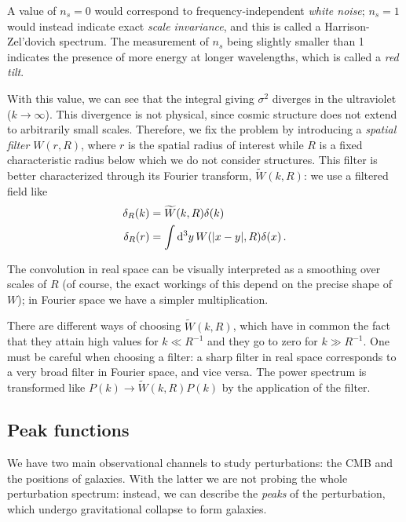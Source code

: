 \documentclass[main.tex]{subfiles}
\begin{document}
A value of \(n_s = 0\) would correspond to frequency-independent \emph{white noise}; \(n_s = 1\) would instead indicate exact \emph{scale invariance}, and this is called a Harrison-Zel'dovich spectrum.
The measurement of \(n_s\) being slightly smaller than 1 indicates the presence of more energy at longer wavelengths, which is called a \emph{red tilt}. 

With this value, we can see that the integral giving \(\sigma^2\) diverges in the ultraviolet (\(k \to \infty\)). 
This divergence is not physical, since cosmic structure does not extend to arbitrarily small scales. Therefore, we fix the problem by introducing a \emph{spatial filter} \(W(r, R)\), where \(r\) is the spatial radius of interest while \(R\) is a fixed characteristic radius below which we do not consider structures. This filter is better characterized through its Fourier transform, \(\widetilde{W}(k, R)\): we use a filtered field like 
%
\begin{align}
\delta_R (k) &= \widetilde{W}(k, R) \delta (k)  \\
\delta _R(r) &= \int \dd[3]{y} W(\abs{x-y}, R) \delta (x)
\,.
\end{align}

The convolution in real space can be visually interpreted as a smoothing over scales of \(R\) (of course, the exact workings of this depend on the precise shape of \(W\)); in Fourier space we have a simpler multiplication.

There are different ways of choosing \(\widetilde{W}(k, R)\), which have in common the fact that they attain high values for \(k \ll R^{-1}\) and they go to zero for \(k \gg R^{-1}\). 
One must be careful when choosing a filter: a sharp filter in real space corresponds to a very broad filter in Fourier space, and vice versa. 
The power spectrum is transformed like \(P(k) \to \widetilde{W}(k, R) P(k)\) by the application of the filter.

\subsection{Peak functions}

We have two main observational channels to study perturbations: the CMB and the positions of galaxies.
With the latter we are not probing the whole perturbation spectrum: instead, we can describe the \emph{peaks} of the perturbation, which undergo gravitational collapse to form galaxies. 
\end{document}
